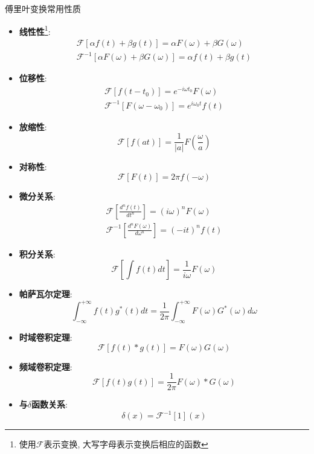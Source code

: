 \documentclass[a4paper,zihao=-4,linespread=1]{ctexrep}
\begin{document}
    \begin{proposition}{傅里叶变换常用性质}
        \begin{itemize}
            \item \textbf{线性性}\footnote[1]{使用$\mathscr{F}$表示变换, 大写字母表示变换后相应的函数}:$$
            \begin{gathered}
            \mathscr{F}[\alpha f(t)+\beta g(t)]=\alpha F(\omega)+\beta G(\omega) \\
            \mathscr{F}^{-1}[\alpha F(\omega)+\beta G(\omega)]=\alpha f(t)+\beta g(t)
            \end{gathered}$$
            \item \textbf{位移性}:$$
            \begin{gathered}
            \mathscr{F}\left[f\left(t-t_{0}\right)\right]=e^{-i \omega t_{0}} F(\omega) \\
            \mathscr{F}^{-1}\left[F\left(\omega-\omega_{0}\right)\right]=e^{i \omega_{0} t} f(t)
            \end{gathered}
            $$
            \item \textbf{放缩性}:$$
            \mathscr{F}[f(a t)]=\frac{1}{|a|} F\left(\frac{\omega}{a}\right)
            $$
            \item \textbf{对称性}:$$
            \mathscr{F}[F(t)]=2 \pi f(-\omega)
            $$
            \item \textbf{微分关系}:$$
            \begin{gathered}
            \mathscr{F}\left[\frac{d^{n} f(t)}{d t^{n}}\right]=(i \omega)^{n} F(\omega) \\
            \mathscr{F}^{-1}\left[\frac{d^{n} F(\omega)}{d \omega^{n}}\right]=(-i t)^{n} f(t)
            \end{gathered}$$
            \item \textbf{积分关系}:$$\mathscr{F}\left[\int f(t)dt\right]=\frac{1}{i\omega}F(\omega)$$
            \item \textbf{帕萨瓦尔定理}:$$
            \int_{-\infty}^{+\infty} f(t) g^*(t) d t=\frac{1}{2 \pi} \int_{-\infty}^{+\infty} F(\omega) G^*(\omega) d \omega
            $$
            \item \textbf{时域卷积定理}:$$
            \mathscr{F}[f(t) * g(t)]=F(\omega) G(\omega)
            $$
            \item \textbf{频域卷积定理}:$$
            \mathscr{F}[f(t) g(t)]=\frac{1}{2 \pi} F(\omega) * G(\omega)
            $$
            \item \textbf{与$\delta$函数关系}:$$\delta(x)=\mathscr{F}^{-1}[1](x)$$
        \end{itemize}
    \end{proposition}
\end{document}
